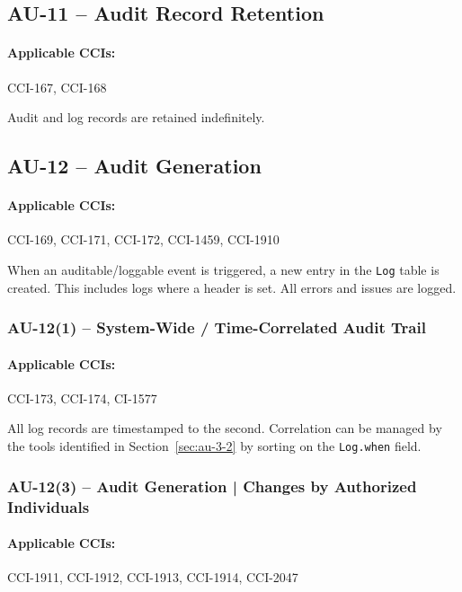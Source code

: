 \documentclass[letterpaper, 10pt, twoside]{article}
\begin{document}
\subsection{AU-11 -- Audit Record Retention}

\paragraph{Applicable CCIs:} CCI-167, CCI-168

Audit and log records are retained indefinitely.

\subsection{AU-12 -- Audit Generation}

\paragraph{Applicable CCIs:} CCI-169, CCI-171, CCI-172, CCI-1459, CCI-1910

When an auditable/loggable event is triggered, a new entry in the \texttt{Log} table is created. This includes logs where a header is set. All errors and issues are logged.

\subsubsection{AU-12(1) -- System-Wide / Time-Correlated Audit Trail}

\paragraph{Applicable CCIs:} CCI-173, CCI-174, CI-1577

All log records are timestamped to the second. Correlation can be managed by the tools identified in Section~\ref{sec:au-3-2} by sorting on the \texttt{Log.when} field.

\subsubsection{AU-12(3) -- Audit Generation | Changes by Authorized Individuals}
\label{sec:au-12-3}

\paragraph{Applicable CCIs:} CCI-1911, CCI-1912, CCI-1913, CCI-1914, CCI-2047
\end{document}
